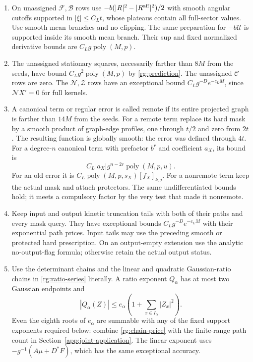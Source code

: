 \begin{enumerate}
\item On unassigned $\mathcal F,\mathcal B$ rows use
$-b(|R|^2-|R^{\rm aff}|^2)/2$ with smooth angular cutoffs supported
in $|\xi|\le C_Lt$, whose plateaus contain all full-sector values.
Use smooth mean branches and no clipping.  The same preparation for
$-b\mathcal U$ is supported inside its smooth mean branch.
Their sup and fixed normalized derivative bounds are
$C_Lg\operatorname{poly}(M,p)$.

\item The unassigned stationary squares, necessarily farther than
$8M$ from the seeds, have bound $C_Lg^2\operatorname{poly}(M,p)$
by \eqref{rg:prediction}.  The unassigned $\mathcal C$ rows are zero.
The $\mathcal N,\mathcal Z$ rows have an exceptional bound
$C_Lg^{-D}e^{-c_LM}$, since $\mathcal N X'=0$ for full kernels.

\item A canonical term or regular error is called remote if its
entire projected graph is farther than $14M$ from the seeds.  For
a remote term replace its hard mask by a smooth product of graph-edge
profiles, one through $t/2$ and zero from $2t$.  The resulting
function is globally smooth: the error was defined through $4t$.
For a degree-$n$ canonical term with prefactor $b^r$ and coefficient
$a_X$, its bound is
\begin{equation}
 C_L|a_X|g^{n-2r}\operatorname{poly}(M,p,u).
 \label{rg:old-polynomial-bound}
\end{equation}
For an old error it is
$C_L\operatorname{poly}(M,p,s_X)[f_X]_{k,j}$.
For a nonremote term keep the actual mask and attach protectors.
The same undifferentiated bounds hold; it meets a compulsory factor
by the very test that made it nonremote.

\item Keep input and output kinetic truncation tails with both of
their paths and every mask query.  They have exceptional bounds
$C_Lg^{-D}e^{-c_LM}$ with their exponential path prices.  Input tails
may use the preceding smooth or protected hard prescription.  On an
output-empty extension use the analytic no-output-flag formula;
otherwise retain the actual output status.

\item Use the determinant chains and the linear and quadratic
Gaussian-ratio chains in \eqref{rg:ratio-series} literally.  A ratio
exponent $Q_\alpha$ has at most two Gaussian endpoints and
\begin{equation}
 |Q_\alpha(Z)|\le e_\alpha
                   \left(1+\sum_{x\in I_\alpha}|Z_x|^2\right).
 \label{rg:ratio-envelope}
\end{equation}
Even the eighth roots of $e_\alpha$ are summable with any of the
fixed support exponents required below: combine \eqref{rg:chain-price}
with the finite-range path count in Section~\ref{app:joint-application}.
The linear exponent uses
$-g^{-1}(A\mu+D^*F)$, which has the same exceptional accuracy.


\end{enumerate}
